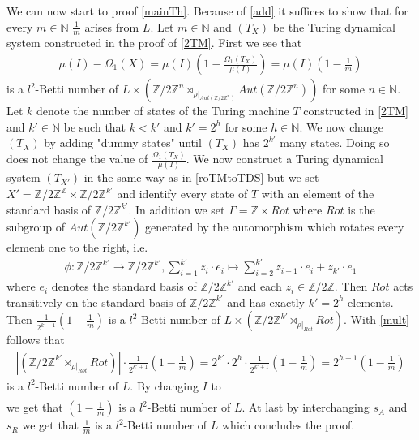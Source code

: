 \documentclass[12pt,a4paper]{scrartcl}
\numberwithin{equation}{section}
\newcommand{\Z}{\mathbb{Z}} %
\newcommand{\N}{\mathbb{N}} %
\newcommand{\2}{\mathbb{Z} / 2 \mathbb{Z}}
\newcommand{\1}{\bar{1}}
\newcommand{\0}{\bar{0}}
\begin{document}
We can now start to proof \ref{mainTh}. Because of \ref{add} it suffices to show that for every $m \in \N$ $\frac{1}{m}$ arises from $L$. Let $m \in \N$  and $(T_X)$ be the Turing dynamical system constructed in the proof of \ref{2TM}. First we see that
\begin{align*}
	\mu (I) - \Omega_1(X) = \mu (I) (1 - \frac{\Omega_1(T_X)}{\mu(I)}) = \mu (I) (1 - \frac{1}{m})
\end{align*}
is a $l^2$-Betti number of $L \times (\2^n \rtimes_{\rho|_{Aut(\2^n)}} Aut(\2^n))$ for some $n \in \N$. Let $k$ denote the number of states of the Turing machine $T$ constructed in \ref{2TM} and $k' \in \N$ be such that $k < k'$ and $k' = 2^{h}$ for some $h \in \N$. We now change $(T_X)$ by adding "dummy states" until $(T_X)$ has $2^{k'}$ many states. Doing so does not change the value of $\frac{\Omega_1(T_X)}{\mu(I)}$. We now construct a Turing dynamical system $(T_{X'})$ in the same way as in \ref{roTMtoTDS} but we set $X' = \2^\Z \times \2^{k'}$ and identify every state of $T$ with an element of the standard basis of $\2^{k'}$. In addition we set $\Gamma = \Z \times Rot$ where $Rot$ is the subgroup of $Aut(\2^{k'})$ generated by the automorphism which rotates every element one to the right, i.e.
\begin{align*}
	\phi : \2^{k'} \to \2^{k'}, \sum_{i =1}^{k'}z_i \cdot e_i \mapsto \sum_{i =2}^{k'}z_{i - 1} \cdot e_i + z_{k'} \cdot e_1
\end{align*}
where $e_i$ denotes the standard basis of $\2^{k'}$ and each $z_i \in \2$. Then $Rot$ acts transitively on the standard basis of $\2^{k'}$ and has exactly $k' = 2^{h}$ elements. Then $\frac{1}{2^{k' + 1}} (1 - \frac{1}{m})$ is a $l^2$-Betti number of $L \times (\2^{k'} \rtimes_{\rho|_{Rot}} Rot)$. With \ref{mult} follows that 
\begin{align*}
	|(\2^{k'} \rtimes_{\rho|_{Rot}} Rot)| \cdot \frac{1}{2^{k' + 1}} (1 - \frac{1}{m}) = 2^{k'} \cdot 2^h \cdot \frac{1}{2^{k' + 1}} (1 - \frac{1}{m}) = 2^{h -1} (1 - \frac{1}{m})
\end{align*}
is a $l^2$-Betti number of $L$. By changing $I$ to
\begin{align*}
	[\1^{h-1} \underline{\1}][s_I]
\end{align*}
we get that $(1 - \frac{1}{m})$ is a $l^2$-Betti number of $L$. At last by interchanging $s_A$ and $s_R$ we get that $\frac{1}{m}$ is a $l^2$-Betti number of $L$ which concludes the proof.
\end{document}
